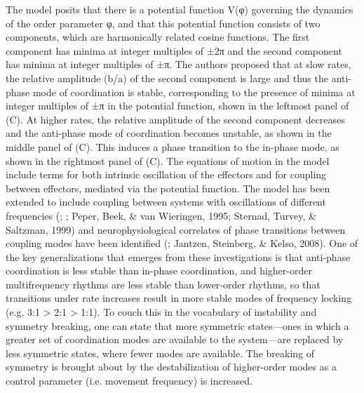   The \citet{HakenEtAl1985} model posits that there is a potential function V(φ) governing the dynamics of the order parameter φ, and that this potential function consists of two components, which are harmonically related cosine functions. The first component has minima at integer multiples of ±2π and the second component has minima at integer multiples of ±π. The authors proposed that at slow rates, the relative amplitude (b/a) of the second component is large and thus the anti-phase mode of coordination is stable, corresponding to the presence of minima at integer multiples of ±π in the potential function, shown in the leftmost panel of (C). At higher rates, the relative amplitude of the second component decreases and the anti-phase mode of coordination becomes unstable, as shown in the middle panel of (C). This induces a phase transition to the in-phase mode, as shown in the rightmost panel of (C). The equations of motion in the model include terms for both intrinsic oscillation of the effectors and for coupling between effectors, mediated via the potential function. The model has been extended to include coupling between systems with oscillations of different frequencies (\citealt{Haken1996}; \citealt{Kelso1991}; Peper, Beek, \& van Wieringen, 1995; Sternad, Turvey, \& Saltzman, 1999) and neurophysiological correlates of phase transitions between coupling modes have been identified  (\citealt{JantzenKelso2007}; Jantzen, Steinberg, \& Kelso, 2008). One of the key generalizations that emerges from these investigations is that anti-phase coordination is less stable than in-phase coordination, and higher-order multifrequency rhythms are less stable than lower-order rhythms, so that transitions under rate increases result in more stable modes of frequency locking (e.g. 3:1 > 2:1 > 1:1). To couch this in the vocabulary of instability and symmetry breaking, one can state that more symmetric states—ones in which a greater set of coordination modes are available to the system—are replaced by less symmetric states, where fewer modes are available. The breaking of symmetry is brought about by the destabilization of higher-order modes as a control parameter (i.e. movement frequency) is increased.

